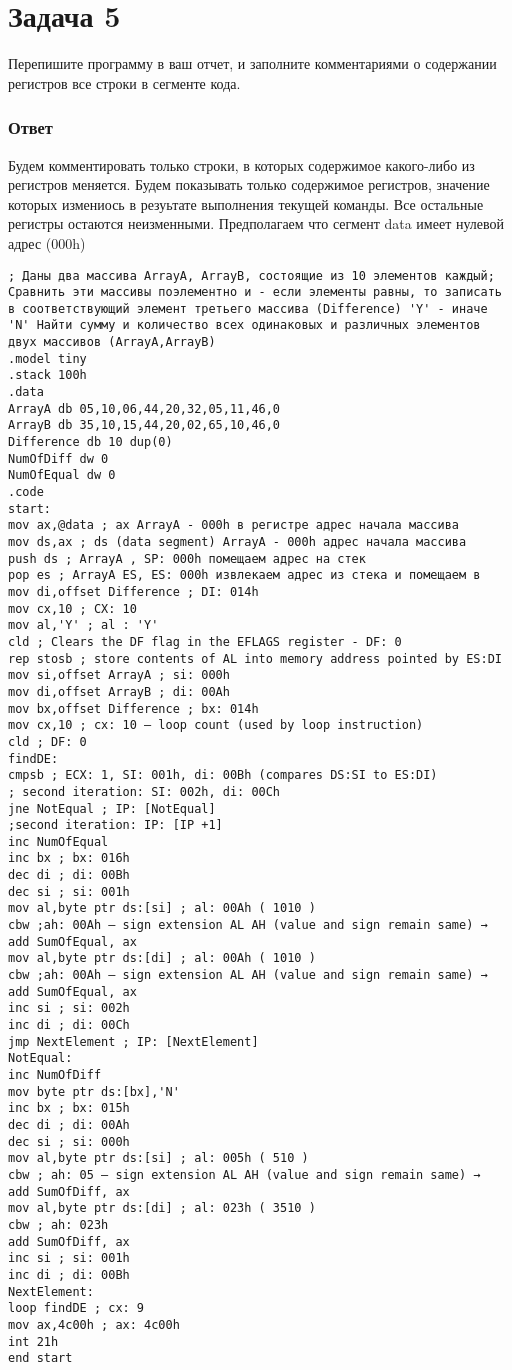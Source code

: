 \documentclass[12pt]{article}
\begin{document}
\section*{Задача 5}
Перепишите программу в ваш отчет, и заполните комментариями о содержании
регистров все строки в сегменте кода.
\subsubsection*{Ответ}
Будем комментировать только строки, в которых содержимое какого-либо из регистров
меняется. Будем показывать только содержимое регистров, значение которых измениось в
резуьтате выполнения текущей команды. Все остальные регистры остаются неизменными.
Предполагаем что сегмент data имеет нулевой адрес (000h)
\begin{verbatim}
; Даны два массива ArrayA, ArrayB, состоящие из 10 элементов каждый; Сравнить эти массивы поэлементно и - если элементы равны, то записать в соответствующий элемент третьего массива (Difference) 'Y' - иначе 'N' Найти сумму и количество всех одинаковых и различных элементов двух массивов (ArrayA,ArrayB)
.model tiny
.stack 100h
.data
ArrayA db 05,10,06,44,20,32,05,11,46,0
ArrayB db 35,10,15,44,20,02,65,10,46,0
Difference db 10 dup(0)
NumOfDiff dw 0
NumOfEqual dw 0
.code
start:
mov ax,@data ; ax ArrayA - 000h в регистре адрес начала массива
mov ds,ax ; ds (data segment) ArrayA - 000h адрес начала массива
push ds ; ArrayA , SP: 000h помещаем адрес на стек
pop es ; ArrayA ES, ES: 000h извлекаем адрес из стека и помещаем в
mov di,offset Difference ; DI: 014h
mov cx,10 ; CX: 10
mov al,'Y' ; al : 'Y'
cld ; Clears the DF flag in the EFLAGS register - DF: 0
rep stosb ; store contents of AL into memory address pointed by ES:DI
mov si,offset ArrayA ; si: 000h
mov di,offset ArrayB ; di: 00Ah
mov bx,offset Difference ; bx: 014h
mov cx,10 ; cx: 10 — loop count (used by loop instruction)
cld ; DF: 0
findDE:
cmpsb ; ECX: 1, SI: 001h, di: 00Bh (compares DS:SI to ES:DI)
; second iteration: SI: 002h, di: 00Ch
jne NotEqual ; IP: [NotEqual]
;second iteration: IP: [IP +1]
inc NumOfEqual
inc bx ; bx: 016h
dec di ; di: 00Bh
dec si ; si: 001h
mov al,byte ptr ds:[si] ; al: 00Ah ( 1010 )
cbw ;ah: 00Ah — sign extension AL AH (value and sign remain same) →
add SumOfEqual, ax
mov al,byte ptr ds:[di] ; al: 00Ah ( 1010 )
cbw ;ah: 00Ah — sign extension AL AH (value and sign remain same) →
add SumOfEqual, ax
inc si ; si: 002h
inc di ; di: 00Ch
jmp NextElement ; IP: [NextElement]
NotEqual:
inc NumOfDiff
mov byte ptr ds:[bx],'N'
inc bx ; bx: 015h
dec di ; di: 00Ah
dec si ; si: 000h
mov al,byte ptr ds:[si] ; al: 005h ( 510 )
cbw ; ah: 05 — sign extension AL AH (value and sign remain same) →
add SumOfDiff, ax
mov al,byte ptr ds:[di] ; al: 023h ( 3510 )
cbw ; ah: 023h
add SumOfDiff, ax
inc si ; si: 001h
inc di ; di: 00Bh
NextElement:
loop findDE ; cx: 9
mov ax,4c00h ; ax: 4c00h
int 21h
end start
\end{verbatim}
\end{document}
